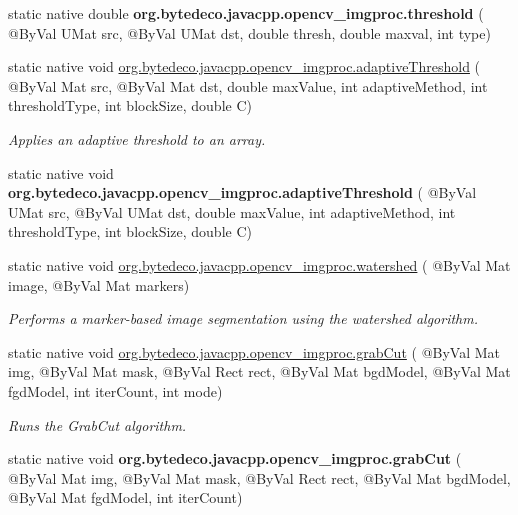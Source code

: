 \begin{DoxyCompactItemize}
\item 
\mbox{\label{group__imgproc__misc_gacc27bb1c53e540ff57759a7b2170f675}} 
static native double {\bfseries org.\+bytedeco.\+javacpp.\+opencv\+\_\+imgproc.\+threshold} ( @By\+Val U\+Mat src, @By\+Val U\+Mat dst, double thresh, double maxval, int type)
\item 
static native void \hyperlink{group__imgproc__misc_ga7901ddcd72f108577c88250a35b9ccbd}{org.\+bytedeco.\+javacpp.\+opencv\+\_\+imgproc.\+adaptive\+Threshold} ( @By\+Val Mat src, @By\+Val Mat dst, double max\+Value, int adaptive\+Method, int threshold\+Type, int block\+Size, double C)
\begin{DoxyCompactList}\small\item\em Applies an adaptive threshold to an array. \end{DoxyCompactList}\item 
\mbox{\label{group__imgproc__misc_ga88adb061c727bbf5e4dc076ce4808794}} 
static native void {\bfseries org.\+bytedeco.\+javacpp.\+opencv\+\_\+imgproc.\+adaptive\+Threshold} ( @By\+Val U\+Mat src, @By\+Val U\+Mat dst, double max\+Value, int adaptive\+Method, int threshold\+Type, int block\+Size, double C)
\item 
static native void \hyperlink{group__imgproc__misc_ga997b28508969435b04cb1bcb8ebc0841}{org.\+bytedeco.\+javacpp.\+opencv\+\_\+imgproc.\+watershed} ( @By\+Val Mat image, @By\+Val Mat markers)
\begin{DoxyCompactList}\small\item\em Performs a marker-\/based image segmentation using the watershed algorithm. \end{DoxyCompactList}\item 
static native void \hyperlink{group__imgproc__misc_gaa33f53e9a934a40de2e80d2cec508ba2}{org.\+bytedeco.\+javacpp.\+opencv\+\_\+imgproc.\+grab\+Cut} ( @By\+Val Mat img, @By\+Val Mat mask, @By\+Val Rect rect, @By\+Val Mat bgd\+Model, @By\+Val Mat fgd\+Model, int iter\+Count, int mode)
\begin{DoxyCompactList}\small\item\em Runs the Grab\+Cut algorithm. \end{DoxyCompactList}\item 
\mbox{\label{group__imgproc__misc_ga3b3ac233c67fb26b0106a5581fdffeef}} 
static native void {\bfseries org.\+bytedeco.\+javacpp.\+opencv\+\_\+imgproc.\+grab\+Cut} ( @By\+Val Mat img, @By\+Val Mat mask, @By\+Val Rect rect, @By\+Val Mat bgd\+Model, @By\+Val Mat fgd\+Model, int iter\+Count)

\end{DoxyCompactItemize}
